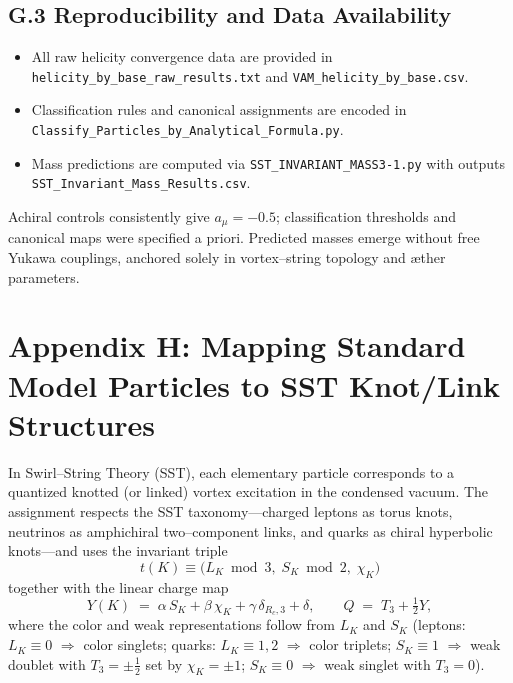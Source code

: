 \documentclass[smallextended]{svjour3}       %
\begin{document}
\subsection*{G.3 Reproducibility and Data Availability}

    \begin{itemize}
    \item All raw helicity convergence data are provided in {\tt helicity\_by\_base\_raw\_results.txt} and {\tt VAM\_helicity\_by\_base.csv}.
    \item Classification rules and canonical assignments are encoded in {\tt Classify\_Particles\_by\_Analytical\_Formula.py}.
    \item Mass predictions are computed via {\tt SST\_INVARIANT\_MASS3-1.py} with outputs {\tt SST\_Invariant\_Mass\_Results.csv}.
    \end{itemize}

    Achiral controls consistently give $a_\mu=-0.5$; classification thresholds and canonical maps were specified a priori.
    Predicted masses emerge without free Yukawa couplings, anchored solely in vortex–string topology and æther parameters.

\section*{Appendix H: Mapping Standard Model Particles to SST Knot/Link Structures}
\label{sec:sm-to-sst-mapping}

    In Swirl–String Theory (SST), each elementary particle corresponds to a quantized knotted (or linked) vortex excitation in the condensed vacuum. The assignment respects the SST taxonomy—charged leptons as torus knots, neutrinos as amphichiral two–component links, and quarks as chiral hyperbolic knots—and uses the invariant triple
    \[
        t(K) \equiv \big(L_K \bmod 3,\; S_K \bmod 2,\; \chi_K\big)
    \]
    together with the linear charge map
    \[
        Y(K) \;=\; \alpha\,S_K + \beta\,\chi_K + \gamma\,\delta_{R_c,3} + \delta,\qquad
        Q \;=\; T_3 + \tfrac12 Y,
    \]
    where the color and weak representations follow from $L_K$ and $S_K$ (leptons: $L_K\!\equiv\!0$ $\Rightarrow$ color singlets; quarks: $L_K\!\equiv\!1,2$ $\Rightarrow$ color triplets; $S_K\!\equiv\!1$ $\Rightarrow$ weak doublet with $T_3=\pm\tfrac12$ set by $\chi_K=\pm1$; $S_K\!\equiv\!0$ $\Rightarrow$ weak singlet with $T_3=0$).
\end{document}
